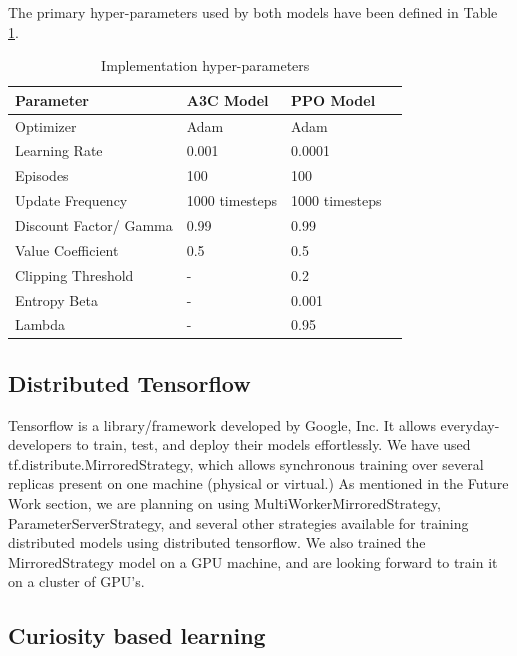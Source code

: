 \documentclass[conference]{IEEEtran}
\begin{document}
The primary hyper-parameters used by both models have been defined in Table \ref{hyperparam_table}.

\begin{table}[h!]
    \centering
    \begin{tabular}{ |l|l|l|l| } 
        \hline
        Parameter & A3C Model & PPO Model \\
        \hline
        Optimizer              & Adam           & Adam \\ 
        Learning Rate          & 0.001          & 0.0001 \\ 
        Episodes               & 100            & 100 \\ 
        Update Frequency       & 1000 timesteps & 1000 timesteps \\ 
        Discount Factor/ Gamma & 0.99           & 0.99 \\ 
        Value Coefficient      & 0.5            & 0.5 \\ 
        Clipping Threshold     & -              & 0.2 \\
        Entropy Beta           & -              & 0.001 \\
        Lambda                 & -              & 0.95 \\
    \hline
    \end{tabular}
    \vspace{1ex}
    \caption{Implementation hyper-parameters}
    \label{hyperparam_table}
\end{table}

\subsection{\textbf{Distributed Tensorflow}}

Tensorflow is a library/framework developed by Google, Inc. It allows everyday-developers to train, test, and deploy their models effortlessly. We have used tf.distribute.MirroredStrategy, which allows synchronous training over several replicas present on one machine (physical or virtual.) As mentioned in the Future Work section, we are planning on using MultiWorkerMirroredStrategy, ParameterServerStrategy, and several other strategies available for training distributed models using distributed tensorflow. We also trained the MirroredStrategy model on a GPU machine, and are looking forward to train it on a cluster of GPU's.

\subsection{\textbf{Curiosity based learning}}
\end{document}
